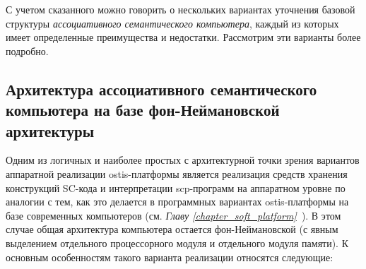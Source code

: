 С учетом сказанного можно говорить о нескольких вариантах уточнения базовой структуры \textit{ассоциативного семантического компьютера}, каждый из которых имеет определенные  преимущества и недостатки. Рассмотрим эти варианты более подробно.

\subsection{Архитектура ассоциативного семантического компьютера на базе фон-Неймановской архитектуры}
\label{subsec_comp_neuman}
Одним из логичных и наиболее простых с архитектурной точки зрения вариантов аппаратной реализации ostis-платформы является реализация средств хранения конструкций SC-кода и интерпретации scp-программ на аппаратном уровне по аналогии с тем, как это делается в программных вариантах ostis-платформы на базе современных компьютеров (см. \textit{Главу \ref{chapter_soft_platform}~}). В этом случае общая архитектура компьютера остается фон-Неймановской (с явным выделением отдельного процессорного модуля и отдельного модуля памяти). К основным особенностям такого варианта реализации относятся следующие:
